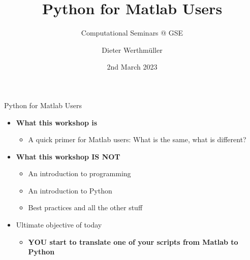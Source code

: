 \documentclass[usepdftitle=false, aspectratio=169]{beamer}
\title{Python for Matlab Users}
\subtitle{Computational Seminars @ GSE}
\date{2nd March 2023}
\author{Dieter Werthmüller}
\institute{TU Delft}
\newcommand{\ato}{\addtocounter{framenumber}{1}}
\begin{document}

\ato %
\maketitle




\begin{frame}
  {Python for Matlab Users}

  \begin{itemize}\itemsep .6cm
    \item \textbf{What this workshop is}
      \begin{itemize}
        \item A quick primer for Matlab users: What is the same, what is different?
      \end{itemize}
    \item \textbf{What this workshop IS NOT}
      \begin{itemize}
        \item An introduction to programming
        \item An introduction to Python
        \item Best practices and all the other stuff
      \end{itemize}
    \item Ultimate objective of today
      \begin{itemize}
        \item \textbf{YOU start to translate one of your scripts from Matlab to
          Python}
      \end{itemize}
  \end{itemize}
\end{frame}
\end{document}
